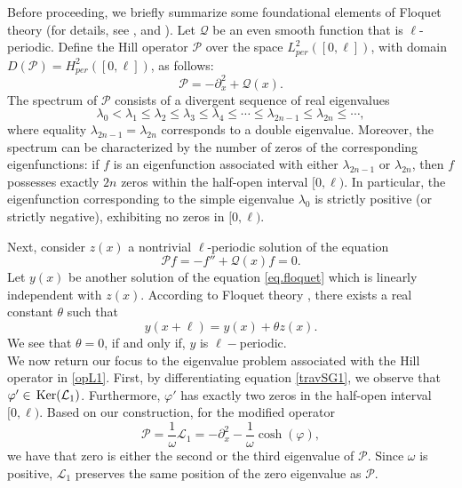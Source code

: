 \documentclass[12pt,reqno,a4paper]{amsart} %
\newcommand{\Ker}{{\rm \,Ker}}
\numberwithin{equation}{section}
\numberwithin{figure}{section}
\begin{document}
 	
 	Before proceeding, we briefly summarize some foundational elements of Floquet theory (for details, see \cite{eas}, \cite{magnus} and \cite{neves}). Let $\mathcal{Q}$ be an even smooth function that is $\ell$-periodic. Define the Hill operator $\mathcal{P}$ over the space $L^2_{per}([0,\ell])$, with domain $D(\mathcal{P})=H^2_{per}([0,\ell])$, as follows:
 	\begin{equation*}
 		\mathcal{P}=-\partial_x^2+\mathcal{Q}(x).
 	\end{equation*}
 	The spectrum of $ \mathcal{P}$ consists of a divergent sequence of real eigenvalues
 	\begin{equation}\label{specP}\lambda_0<\lambda_1\leq\lambda_2 \leq\lambda_3 \leq\lambda_4 \leq \cdots \leq \lambda_{2n-1}\leq \lambda_{2n}\leq \cdots ,\end{equation}
 	where equality $\lambda_{2n-1}= \lambda_{2n}$ corresponds to a double eigenvalue. Moreover, the spectrum can be characterized by the number of zeros of the corresponding eigenfunctions: if 
 	$f$ is an eigenfunction associated with either $\lambda_{2n-1}$ or $\lambda_{2n}$, then $f$ possesses exactly $2n$ zeros within the half-open interval 
 	$[0,\ell)$. In particular, the eigenfunction corresponding to the simple eigenvalue $\lambda_0$ is strictly positive (or strictly negative), exhibiting no zeros in $[0,\ell)$.
 	
 	Next, consider $z(x)$ a nontrivial $\ell$-periodic solution of the equation 
 	\begin{equation}\label{eq.floquet}
 		\mathcal{P}f=-f''+\mathcal{Q}(x)f=0.
 	\end{equation}
 	Let $y(x)$ be another solution of the equation \eqref{eq.floquet} which is linearly independent with $z(x)$. According to Floquet theory \cite{magnus}, there exists a real constant $\theta $ such that 
 	\begin{equation}\label{theta.param}
 		y(x+\ell)=y(x)+\theta z(x).
 	\end{equation} 
 	We see that	$\theta =0$, if and only if, $y$ is $\ell-$periodic.\\
 	\indent We now return our focus to the eigenvalue problem associated with the Hill operator in \eqref{opL1}. First, by differentiating equation \eqref{travSG1}, we observe that $\varphi' \in \Ker(\mathcal{L}_1)$. Furthermore, $\varphi'$ has exactly two zeros in the half-open interval $[0,\ell)$. Based on our construction, for the modified operator
 	\begin{equation}\label{operadorL2}
 		\mathcal{P} = \frac{1}{\omega}\mathcal{L}_1 = -\partial_x^2 - \frac{1}{\omega}\cosh(\varphi),
 	\end{equation}
 	we have that zero is either the second or the third eigenvalue of $\mathcal{P}$. Since $\omega$ is positive, $\mathcal{L}_1$ preserves the same position of the zero eigenvalue as $\mathcal{P}$.
 	
\end{document}
